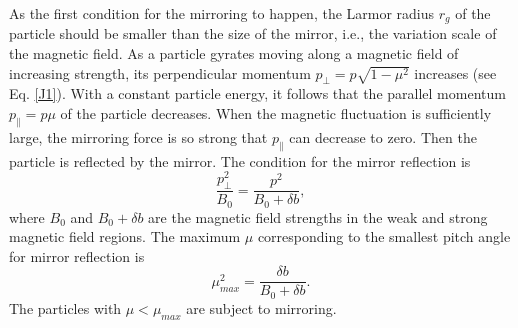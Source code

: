 \documentclass[preprint2,twocolumn,times,tighten]{aastex63}
\begin{document}
As the first condition 
for the mirroring to happen, 
the Larmor radius $r_g$ of the particle should be smaller than the size of the mirror, i.e., the variation scale of the magnetic field. 
As a particle gyrates moving along a magnetic field of increasing strength, its perpendicular
momentum $p_\perp = p \sqrt{1-\mu^2}$
increases (see Eq. \eqref{J1}). 
With a constant particle energy, it follows that 
the parallel momentum $p_\| = p \mu$
of the particle decreases. 
When the magnetic fluctuation is sufficiently large, the mirroring force is so strong that $p_\|$ can decrease to zero. 
Then the particle is reflected by the mirror. 
The condition for the mirror reflection is  
\begin{equation}
\frac{p_\bot^2}{B_0}=\frac{p^2}{B_0+\delta b},
\end{equation}
where $B_0$ and $B_0 + \delta b$ are the magnetic field strengths in the weak and strong magnetic field regions.
The maximum $\mu$ corresponding to the smallest pitch angle for mirror reflection is  
\begin{equation}
\mu^2_{max}=\frac{\delta b}{B_0+\delta b}.
\label{mu}
\end{equation}
The particles with $\mu < \mu_{max}$ are subject to mirroring. 
\end{document}
